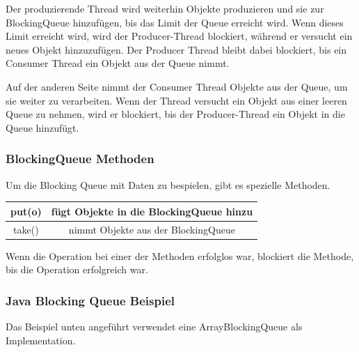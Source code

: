 Der produzierende Thread wird weiterhin Objekte produzieren und sie zur BlockingQueue hinzufügen, bis das Limit der Queue erreicht wird. Wenn dieses Limit erreicht wird, wird der Producer-Thread blockiert, während er versucht ein neues Objekt hinzuzufügen. Der Producer Thread bleibt dabei blockiert, bis ein Consumer Thread ein Objekt aus der Queue nimmt.
 
Auf der anderen Seite nimmt der Consumer Thread Objekte aus der Queue, um sie weiter zu verarbeiten. Wenn der Thread versucht ein Objekt aus einer leeren Queue zu nehmen, wird er blockiert, bis der Producer-Thread ein Objekt in die Queue hinzufügt.
 
\subsubsection{BlockingQueue Methoden}
Um die Blocking Queue mit Daten zu bespielen, gibt es spezielle Methoden.
 
\begin{center}
    \begin{tabular}{ |c|c| }
     \hline
     put(o) & fügt Objekte in die BlockingQueue hinzu \\
     \hline
     take() & nimmt Objekte aus der BlockingQueue \\
     \hline
    \end{tabular}
    \end{center}
 
Wenn die Operation bei einer der Methoden erfolglos war, blockiert die Methode, bis die Operation erfolgreich war.
 
\subsubsection{Java Blocking Queue Beispiel}
Das Beispiel unten angeführt verwendet eine ArrayBlockingQueue als Implementation.
 
 
 
